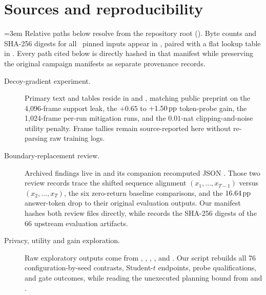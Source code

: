 \section{Sources and reproducibility}
\label{app:artifacts}

{\emergencystretch=3em
Relative paths below resolve from the repository root (\repourl{}). Byte
counts and SHA-256 digests for all \PinnedInputs\ pinned inputs appear in
, paired with a flat lookup table in
. Every path cited below is directly hashed in
that manifest while preserving the original campaign manifests as separate
provenance records.

\begin{description}
\item[\hypertarget{artifact-E1}{Decoy-gradient experiment.}]
Primary text and tables reside in
 and
, matching
public preprint \cite{paper1} on the 4,096-frame support leak, the $+0.65$
to $+1.50\,\mathrm{pp}$ token-probe gain, the 1,024-frame per-run mitigation runs,
and the $0.01$-nat clipping-and-noise utility penalty. Frame tallies remain
source-reported here without re-parsing raw training logs.

\item[\hypertarget{artifact-B1}{Boundary-replacement review.}]
Archived findings live in
and its companion recomputed JSON
.
Those two review records trace the shifted sequence alignment
$(x_1,\ldots,x_{T-1})$ versus $(x_2,\ldots,x_T)$, the six zero-return
baseline comparisons, and the $16.64\,\mathrm{pp}$ answer-token drop to their
original evaluation outputs. Our manifest hashes both review files
directly, while  records the SHA-256 digests
of the 66 upstream evaluation artifacts.

\item[\hypertarget{artifact-R1}{Privacy, utility and gain exploration.}]
Raw exploratory outputs come from
,
,
,
, and
. Our script rebuilds
all 76 configuration-by-seed contrasts, Student-$t$ endpoints, probe
qualifications, and gate outcomes, while reading the unexecuted planning
bound from
and .


\end{description}}
